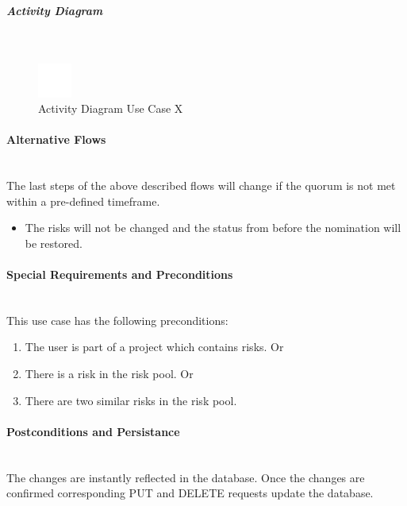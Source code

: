 \subparagraph{Activity Diagram}\mbox{}\\
\begin{figure}[h]
	\centering
	\includegraphics[width=0.1\textwidth]{Content/Domain/placeholder.png}
	\caption{Activity Diagram Use Case X}
	\label{fig:label55}
\end{figure}

\paragraph*{Alternative Flows}\mbox{}\\
The last steps of the above described flows will change if the quorum is not met within a pre-defined timeframe.
\begin{itemize}
	\vspace{-3mm}
	\setlength\itemsep{-1em}
	\item The risks will not be changed and the status from before the nomination will be restored.
\end{itemize}
	
\paragraph*{Special Requirements and Preconditions}\mbox{}\\
This use case has the following preconditions:
\begin{enumerate}
	\vspace{-3mm}
	\setlength\itemsep{-1em}
	\item The user is part of a project which contains risks.
	Or
	\item There is a risk in the risk pool.
	Or
	\item There are two similar risks in the risk pool.
\end{enumerate}

\paragraph*{Postconditions and Persistance}\mbox{}\\
The changes are instantly reflected in the database. Once the changes are confirmed corresponding PUT and DELETE requests update the database.

\newpage
